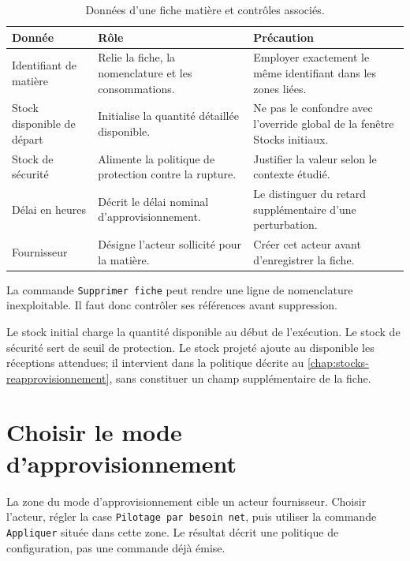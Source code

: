 \begin{table}[H]
  \centering
  \begin{tabularx}{\textwidth}{L{0.26\textwidth} Y Y}
    \toprule
    Donnée & Rôle & Précaution \\
    \midrule
    Identifiant de matière & Relie la fiche, la nomenclature et les consommations. & Employer exactement le même identifiant dans les zones liées. \\
    Stock disponible de départ & Initialise la quantité détaillée disponible. & Ne pas le confondre avec l'override global de la fenêtre Stocks initiaux. \\
    Stock de sécurité & Alimente la politique de protection contre la rupture. & Justifier la valeur selon le contexte étudié. \\
    Délai en heures & Décrit le délai nominal d'approvisionnement. & Le distinguer du retard supplémentaire d'une perturbation. \\
    Fournisseur & Désigne l'acteur sollicité pour la matière. & Créer cet acteur avant d'enregistrer la fiche. \\
    \bottomrule
  \end{tabularx}
  \caption{Données d'une fiche matière et contrôles associés.}
  \label{tab:fiche-matiere}
\end{table}

La commande \texttt{Supprimer fiche} peut rendre une ligne de nomenclature inexploitable. Il faut donc contrôler ses références avant suppression.

Le stock initial charge la quantité disponible au début de l'exécution. Le stock de sécurité sert de seuil de protection. Le stock projeté ajoute au disponible les réceptions attendues; il intervient dans la politique décrite au \cref{chap:stocks-reapprovisionnement}, sans constituer un champ supplémentaire de la fiche.

\section{Choisir le mode d'approvisionnement}

La zone du mode d'approvisionnement cible un acteur fournisseur. Choisir l'acteur, régler la case \texttt{Pilotage par besoin net}, puis utiliser la commande \texttt{Appliquer} située dans cette zone. Le résultat décrit une politique de configuration, pas une commande déjà émise.



